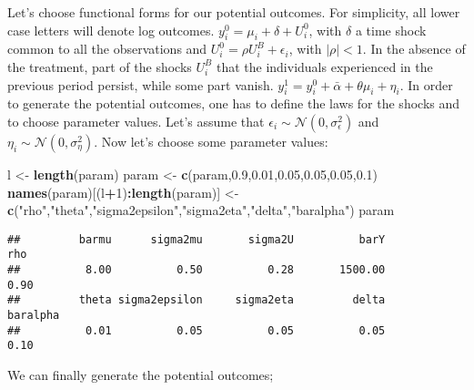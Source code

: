 \documentclass[]{book}
\newenvironment{Shaded}{\begin{snugshade}}{\end{snugshade}}
\newcommand{\DecValTok}[1]{\textcolor[rgb]{0.00,0.00,0.81}{#1}}
\newcommand{\FloatTok}[1]{\textcolor[rgb]{0.00,0.00,0.81}{#1}}
\newcommand{\KeywordTok}[1]{\textcolor[rgb]{0.13,0.29,0.53}{\textbf{#1}}}
\newcommand{\NormalTok}[1]{#1}
\newcommand{\OperatorTok}[1]{\textcolor[rgb]{0.81,0.36,0.00}{\textbf{#1}}}
\newcommand{\StringTok}[1]{\textcolor[rgb]{0.31,0.60,0.02}{#1}}
\theoremstyle{definition}
\theoremstyle{definition}
\theoremstyle{definition}
\theoremstyle{remark}
\let\BeginKnitrBlock\begin \let\EndKnitrBlock\end
\begin{document}
\BeginKnitrBlock{example}
\protect\hypertarget{exm:unnamed-chunk-3}{}{\label{exm:unnamed-chunk-3} }Let's choose functional forms for our potential outcomes.
For simplicity, all lower case letters will denote log outcomes.
\(y_i^0=\mu_i+\delta+U_i^0\), with \(\delta\) a time shock common to all the observations and \(U_i^0=\rho U_i^B+\epsilon_i\), with \(|\rho|<1\).
In the absence of the treatment, part of the shocks \(U_i^B\) that the individuals experienced in the previous period persist, while some part vanish.
\(y_i^1=y_i^0+\bar{\alpha}+\theta\mu_i+\eta_i\).
In order to generate the potential outcomes, one has to define the laws for the shocks and to choose parameter values.
Let's assume that \(\epsilon_i\sim\mathcal{N}(0,\sigma^2_{\epsilon})\) and \(\eta_i\sim\mathcal{N}(0,\sigma^2_{\eta})\).
Now let's choose some parameter values:
\EndKnitrBlock{example}

\begin{Shaded}
\begin{Highlighting}[]
\NormalTok{l <-}\StringTok{ }\KeywordTok{length}\NormalTok{(param)}
\NormalTok{param <-}\StringTok{ }\KeywordTok{c}\NormalTok{(param,}\FloatTok{0.9}\NormalTok{,}\FloatTok{0.01}\NormalTok{,}\FloatTok{0.05}\NormalTok{,}\FloatTok{0.05}\NormalTok{,}\FloatTok{0.05}\NormalTok{,}\FloatTok{0.1}\NormalTok{)}
\KeywordTok{names}\NormalTok{(param)[(l}\OperatorTok{+}\DecValTok{1}\NormalTok{)}\OperatorTok{:}\KeywordTok{length}\NormalTok{(param)] <-}\StringTok{ }\KeywordTok{c}\NormalTok{(}\StringTok{"rho"}\NormalTok{,}\StringTok{"theta"}\NormalTok{,}\StringTok{"sigma2epsilon"}\NormalTok{,}\StringTok{"sigma2eta"}\NormalTok{,}\StringTok{"delta"}\NormalTok{,}\StringTok{"baralpha"}\NormalTok{)}
\NormalTok{param}
\end{Highlighting}
\end{Shaded}

\begin{verbatim}
##         barmu      sigma2mu       sigma2U          barY           rho 
##          8.00          0.50          0.28       1500.00          0.90 
##         theta sigma2epsilon     sigma2eta         delta      baralpha 
##          0.01          0.05          0.05          0.05          0.10
\end{verbatim}

We can finally generate the potential outcomes;
\end{document}
